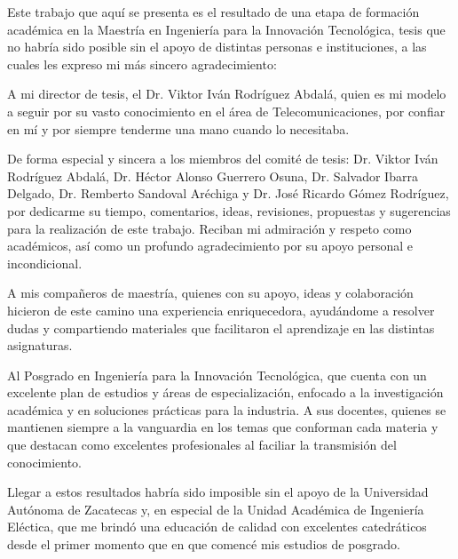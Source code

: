 Este trabajo que aquí se presenta es el resultado de una etapa de formación académica en la Maestría en Ingeniería para la Innovación Tecnológica, tesis que no habría sido posible sin el apoyo de distintas personas e instituciones, a las cuales les expreso mi más sincero agradecimiento:

\vspace{0.5cm}

A mi director de tesis, el Dr. Viktor Iván Rodríguez Abdalá, quien es mi modelo a seguir por su vasto conocimiento en el área de Telecomunicaciones, por confiar en mí y por siempre tenderme una mano cuando lo necesitaba.

\vspace{0.5cm}

De forma especial y sincera a los miembros del comité de tesis: Dr. Viktor Iván Rodríguez Abdalá, Dr. Héctor Alonso Guerrero Osuna, Dr. Salvador Ibarra Delgado, Dr. Remberto Sandoval Aréchiga y Dr. José Ricardo Gómez Rodríguez, por dedicarme su tiempo, comentarios, ideas, revisiones, propuestas y sugerencias para la realización de este trabajo. Reciban mi admiración y respeto como académicos, así como un profundo agradecimiento por su apoyo personal e incondicional.

\vspace{0.5cm}

A mis compañeros de maestría, quienes con su apoyo, ideas y colaboración hicieron de este camino una experiencia enriquecedora, ayudándome a resolver dudas y compartiendo materiales que facilitaron el aprendizaje en las distintas asignaturas.

\vspace{0.5cm}

Al Posgrado en Ingeniería para la Innovación Tecnológica, que cuenta con un excelente plan de estudios y áreas de especialización, enfocado a la investigación académica y en soluciones prácticas para la industria. A sus docentes, quienes se mantienen siempre a la vanguardia en los temas que conforman cada materia y que destacan como excelentes profesionales al faciliar la transmisión del conocimiento.

\vspace{0.5cm}

Llegar a estos resultados habría sido imposible sin el apoyo de la Universidad Autónoma de Zacatecas y, en especial de la Unidad Académica de Ingeniería Eléctica, que me brindó una educación de calidad con excelentes catedráticos desde el primer momento que en que comencé mis estudios de posgrado.

